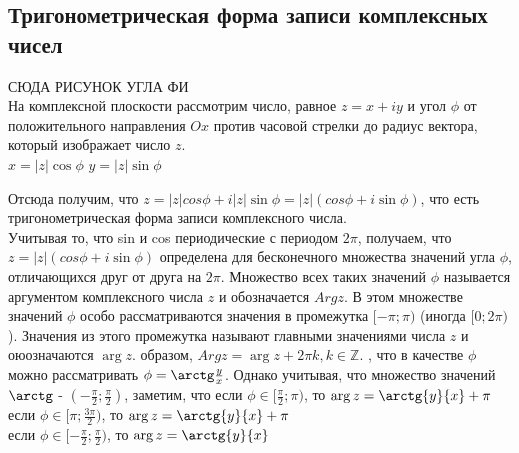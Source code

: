 \documentclass[oneside]{book}
\begin{document}
\begin{itemize}
\begin{enumerate}
\section{Тригонометрическая форма записи комплексных чисел}
СЮДА РИСУНОК УГЛА ФИ\\
На комплексной плоскости рассмотрим число, равное $z=x+iy$ и угол $\phi$ от положительного направления $Ox$ против часовой стрелки до радиус вектора, который изображает число $z$.\\
$x=|z|\cos\phi$
$y=|z|\sin\phi$
\par Отсюда получим, что $z=|z|cos\phi+i|z|\sin\phi=|z|(cos\phi+i\sin\phi)$, что есть тригонометрическая форма записи комплексного числа.\\
Учитывая то, что sin и cos периодические с периодом $2\pi$, получаем, что $z=|z|(cos\phi+i\sin\phi)$ определена для бесконечного множества значений угла $\phi$, отличающихся друг от друга на $2\pi$. Множество всех таких значений $\phi$ называется аргументом комплексного числа $z$ и обозначается $Argz$. В этом множестве значений $\phi$ особо рассматриваются значения в промежутка $[-\pi;\pi)$ (иногда $[0; 2\pi)$). Значения из этого промежутка называют главными значениями числа $z$ и оюозначаются $\arg z$.
 образом, $Argz = \arg z + 2\pi k, k \in \mathbb{Z}$.
, что в качестве $\phi$ можно рассматривать $\phi=\arctg\frac{y}{x}$. Однако учитывая, что множество значений $\arctg$ - $(-\frac{\pi}{2}; \frac{\pi}{2})$, заметим, что если $\phi \in [\frac{\pi}{2}; \pi)$, то $\arg z = \arctg{y}{x}+\pi$\\
если $\phi \in [\pi;\frac{3\pi}{2})$, то $\arg z = \arctg{y}{x}+\pi$\\
если $\phi \in [-\frac{\pi}{2}; \frac{\pi}{2})$, то $\arg z = \arctg{y}{x}$\\

\end{enumerate}
\end{itemize}
\end{document}
